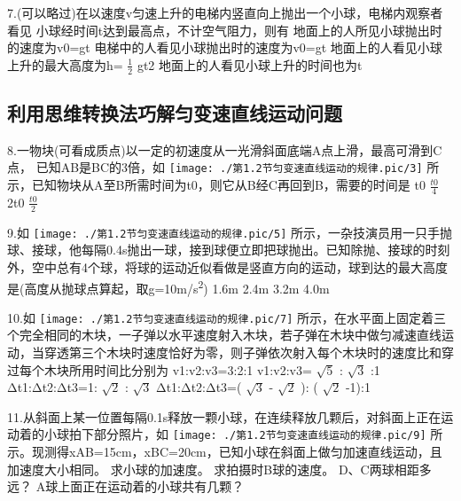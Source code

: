 \documentclass[a4paper,fontset=windows]{ctexart}
\begin{document}
7.(可以略过)在以速度v匀速上升的电梯内竖直向上抛出一个小球，电梯内观察者看见
小球经时间t达到最高点，不计空气阻力，则有
\choice[A] 地面上的人所见小球抛出时的速度为v0=gt
\choice[B] 电梯中的人看见小球抛出时的速度为v0=gt
\choice[C] 地面上的人看见小球上升的最大高度为h= $\frac{1}{2}$ 
gt2
\choice[D] 地面上的人看见小球上升的时间也为t

\subsection{利用思维转换法巧解匀变速直线运动问题}


8.一物块(可看成质点)以一定的初速度从一光滑斜面底端A点上滑，最高可滑到C点，
已知AB是BC的3倍，如 \texttt{[image: ./第1.2节匀变速直线运动的规律.pic/3]} 所示，已知物块从A至B所需时间为t0，则它从B经C再回到B，需要的时间是
\choice[A] t0
\choice[B]  $\frac{t0}{4}$ 
\choice[C] 2t0
\choice[D]  $\frac{t0}{2}$ 

9.如 \texttt{[image: ./第1.2节匀变速直线运动的规律.pic/5]} 所示，一杂技演员用一只手抛球、接球，他每隔0.4s抛出一球，接到球便立即把球抛出。已知除抛、接球的时刻外，空中总有4个球，将球的运动近似看做是竖直方向的运动，球到达的最大高度是(高度从抛球点算起，取g=10\si{m/s^2})
\choice[A] 1.6m
\choice[B] 2.4m
\choice[C] 3.2m
\choice[D] 4.0m

10.如 \texttt{[image: ./第1.2节匀变速直线运动的规律.pic/7]} 所示，在水平面上固定着三个完全相同的木块，一子弹以水平速度射入木块，若子弹在木块中做匀减速直线运动，当穿透第三个木块时速度恰好为零，则子弹依次射入每个木块时的速度比和穿过每个木块所用时间比分别为
\choice[A] v1:v2:v3=3:2:1
\choice[B] v1:v2:v3= $\sqrt{5}$ 
: $\sqrt{3}$ 
:1
\choice[C] Δt1:Δt2:Δt3=1: $\sqrt{2}$ 
: $\sqrt{3}$ 
\choice[D] Δt1:Δt2:Δt3=( $\sqrt{3}$ 
- $\sqrt{2}$ 
):
( $\sqrt{2}$ 
-1):1

11.从斜面上某一位置每隔0.1s释放一颗小球，在连续释放几颗后，对斜面上正在运
动着的小球拍下部分照片，如 \texttt{[image: ./第1.2节匀变速直线运动的规律.pic/9]} 所示。现测得xAB=15cm，xBC=20cm，已知小球在斜面上做匀加速直线运动，且加速度大小相同。
\qitem 求小球的加速度。
\qitem 求拍摄时B球的速度。
\qitem D、C两球相距多远？
\qitem A球上面正在运动着的小球共有几颗？
 
\end{document}

